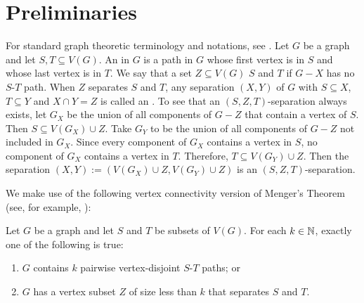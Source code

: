 \documentclass{patmorin}
\newcommand{\pat}[1]{\textcolor{Blue}{[Pat: #1]}}
\newcommand{\hussein}[1]{\textcolor{purple}{HH: #1}}
\begin{document}

\section{Preliminaries}

For standard graph theoretic terminology and notations, see \citet{diestel2017graph}.
Let $G$ be a graph and let $S,T\subseteq V(G)$. An  in $G$ is a path in $G$ whose first vertex is in $S$ and whose last vertex is in $T$.  We say that a set $Z\subseteq V(G)$  $S$ and $T$ if $G-X$ has no $S$-$T$ path.  When $Z$ separates $S$ and $T$, any separation $(X,Y)$ of $G$ with $S\subseteq X$, $T\subseteq Y$ and $X\cap Y=Z$ is called an . To see that an $(S,Z,T)$-separation always exists, let $G_X$ be the union of all components of $G-Z$ that contain a vertex of $S$. Then $S\subseteq V(G_X)\cup Z$. Take $G_Y$ to be the union of all components of $G-Z$ not included in $G_X$. Since  every component of $G_X$ contains a vertex in $S$, no component of $G_X$ contains a vertex in $T$.  Therefore, $T\subseteq V(G_Y)\cup Z$.  Then the separation $(X,Y):=(V(G_X)\cup Z, V(G_Y)\cup Z)$ is an $(S,Z,T)$-separation.  

We make use of the following vertex connectivity version of Menger's Theorem (see, for example, \citet[Theorem~3.3.1]{diestel2017graph}): \

\begin{thm}\label{menger}
  Let $G$ be a graph and let $S$ and $T$ be subsets of $V(G)$. For each $k\in\mathbb{N}$, exactly one of the following is true:
  \begin{enumerate}[nosep,nolistsep,label=\rm(\roman*),ref=(\roman*)2]
      \item $G$ contains $k$ pairwise vertex-disjoint $S$-$T$ paths; or
      \item $G$ has a vertex subset $Z$ of size less than $k$ that separates $S$ and $T$.
  \end{enumerate}
\end{thm}
\end{document}
